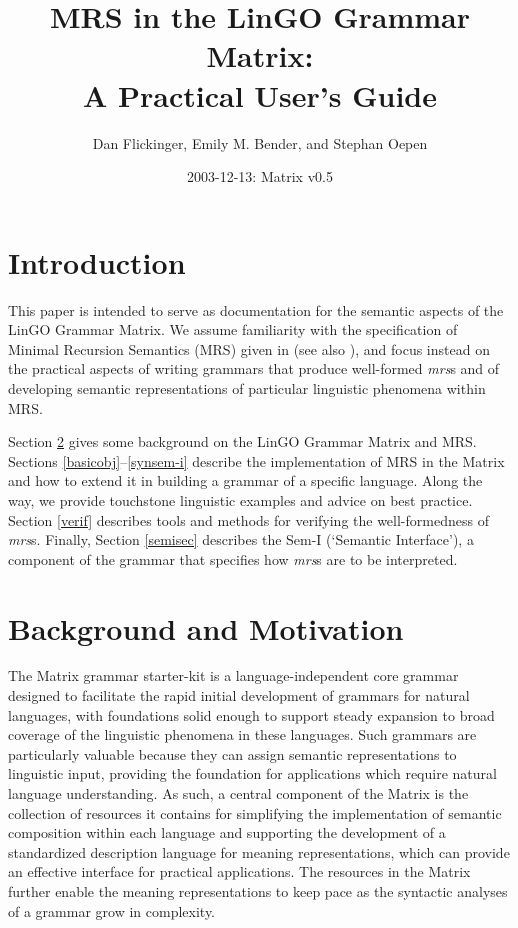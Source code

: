 \documentclass[12pt]{article}
\title{MRS in the LinGO Grammar Matrix:\\ A Practical User's Guide}
\author{Dan Flickinger, Emily M. Bender, and Stephan Oepen}
\date{2003-12-13: Matrix v0.5}
\begin{document}
\maketitle

\setcounter{tocdepth}{2}  %
\tableofcontents
\newpage
\section{Introduction}

This paper is intended to serve as documentation for the semantic
aspects of the LinGO Grammar Matrix. We assume familiarity with the
specification of Minimal Recursion Semantics (MRS) given in
 (see also ),
and focus instead on the practical aspects of writing grammars
that produce well-formed {\it mrs}s and of developing semantic
representations of particular linguistic phenomena within MRS.

Section \ref{backmot} gives some background on the LinGO Grammar
Matrix and MRS.  Sections \ref{basicobj}--\ref{synsem-i} describe
the implementation of MRS in the Matrix and how to extend it in
building a grammar of a specific language.  Along the way, we
provide touchstone linguistic examples and advice on best practice.
Section \ref{verif} describes tools
and methods for verifying the well-formedness of {\it mrs}s.  Finally,
Section \ref{semisec} describes the Sem-I (`Semantic Interface'), a component
of the grammar that specifies how {\it mrs}s are to be interpreted.

\section{Background and Motivation}
\label{backmot}

The Matrix grammar starter-kit \cite{Ben:Fli:Oep:02} is a
language-independent core grammar designed to facilitate the rapid
initial development of grammars for natural languages, with
foundations solid enough to support steady expansion to broad coverage
of the linguistic phenomena in these languages.  Such grammars are
particularly valuable because they can assign semantic representations
to linguistic input, providing the foundation for applications which
require natural language understanding.  As such, a central component
of the Matrix is the collection of resources it contains for
simplifying the implementation of semantic composition within each
language and supporting the development of a standardized description
language for meaning representations, which can provide an effective
interface for practical applications.  The resources in the Matrix
further enable the meaning representations to keep pace as the
syntactic analyses of a grammar grow in complexity.
\end{document}
